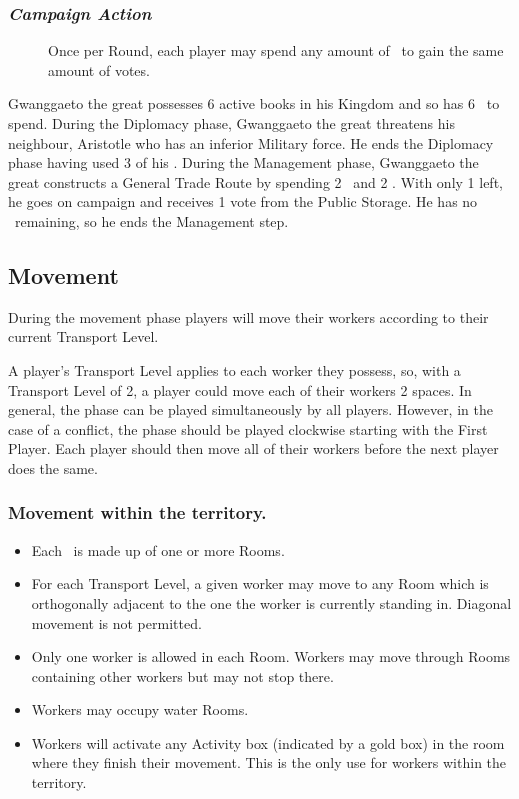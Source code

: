 \documentclass[10pt,twocolumn]{article}
\begin{document}
\subsubsection*{\textit{Campaign Action}}
\begin{description}
\item[] Once per Round, each player may spend any amount of \polfs\ to gain the same amount of votes.
\end{description}
\begin{BoxExample}Gwanggaeto the great possesses 6 active books in his Kingdom and so has 6 \polfs\ to spend. During the Diplomacy phase, Gwanggaeto the great threatens his neighbour, Aristotle who has an inferior Military force. He ends the Diplomacy phase having used 3 of his \polf. During the Management phase, Gwanggaeto the great constructs a General Trade Route by spending 2 \minerals\ and 2 \polfs. With only 1 \polf left, he goes on campaign and receives 1 vote from the Public Storage. He has no \polfs\ remaining, so he ends the Management step.\end{BoxExample}

\subsection{Movement}
During the movement phase players will move their workers according to their current Transport Level.


A player's Transport Level applies to each worker they possess, so, with a Transport Level of 2, a player could move each of their workers 2 spaces.
In general, the  phase can be played simultaneously by all players. However, in the case of a conflict, the phase should be played clockwise starting with the First Player. Each player should then move all of their workers before the next player does the same.

\subsubsection{Movement within the territory.}
\begin{itemize}
\item Each \landcard\ is made up of one or more Rooms.
\item For each Transport Level, a given worker may move to any Room which is orthogonally adjacent to the one the worker is currently standing in. Diagonal movement is not permitted.
\item Only one worker is allowed in each Room. Workers may move through Rooms containing other workers but may not stop there.
\item Workers may occupy water Rooms.
\item Workers will activate any Activity box (indicated by a gold box) in the room where they finish their movement. This is the only use for workers within the territory.
\end{itemize}
\end{document}
